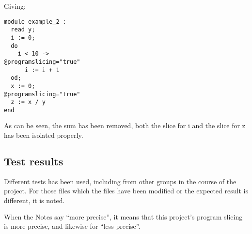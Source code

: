 Giving:

\begin{lstlisting}
module example_2 :
  read y;
  i := 0;
  do
    i < 10 ->
@programslicing="true"
      i := i + 1
  od;
  x := 0;
@programslicing="true"
  z := x / y
end
\end{lstlisting}

As can be seen, the sum has been removed, both the slice for i
and the slice for z has been isolated properly.

\subsection{Test results}

Different tests has been used, including from other groups in the course
of the project. For those files which the files have been modified or the
expected result is different, it is noted.

When the Notes say ``more precise'', it means that this project's program
slicing is more precise, and likewise for ``less precise''.

